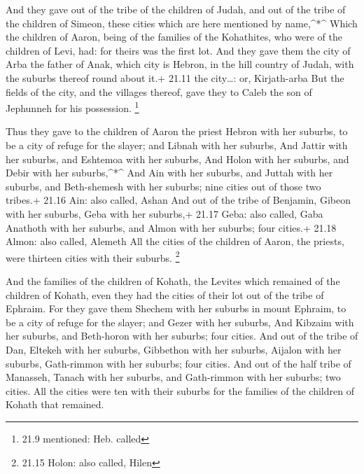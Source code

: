  And they gave out of the tribe of the children of Judah,
and out of the tribe of the children of Simeon, these cities which are
here mentioned by name,\^{}*\^{}  Which the children of
Aaron, being of the families of the Kohathites, who were of the children
of Levi, had: for theirs was the first lot.  And they gave
them the city of Arba the father of Anak, which city is Hebron, in the
hill country of Judah, with the suburbs thereof round about it.+ 21.11
the city\ldots: or, Kirjath-arba  But the fields of the
city, and the villages thereof, gave they to Caleb the son of Jephunneh
for his possession. \footnote{21.9 mentioned: Heb. called}

 Thus they gave to the children of Aaron the priest Hebron
with her suburbs, to be a city of refuge for the slayer; and Libnah with
her suburbs,  And Jattir with her suburbs, and Eshtemoa
with her suburbs,  And Holon with her suburbs, and Debir
with her suburbs,\^{}*\^{}  And Ain with her suburbs, and
Juttah with her suburbs, and Beth-shemesh with her suburbs; nine cities
out of those two tribes.+ 21.16 Ain: also called, Ashan 
And out of the tribe of Benjamin, Gibeon with her suburbs, Geba with her
suburbs,+ 21.17 Geba: also called, Gaba  Anathoth with her
suburbs, and Almon with her suburbs; four cities.+ 21.18 Almon: also
called, Alemeth  All the cities of the children of Aaron,
the priests, were thirteen cities with their suburbs. \footnote{21.15
  Holon: also called, Hilen}

 And the families of the children of Kohath, the Levites
which remained of the children of Kohath, even they had the cities of
their lot out of the tribe of Ephraim.  For they gave them
Shechem with her suburbs in mount Ephraim, to be a city of refuge for
the slayer; and Gezer with her suburbs,  And Kibzaim with
her suburbs, and Beth-horon with her suburbs; four cities. 
And out of the tribe of Dan, Eltekeh with her suburbs, Gibbethon with
her suburbs,  Aijalon with her suburbs, Gath-rimmon with
her suburbs; four cities.  And out of the half tribe of
Manasseh, Tanach with her suburbs, and Gath-rimmon with her suburbs; two
cities.  All the cities were ten with their suburbs for the
families of the children of Kohath that remained.

